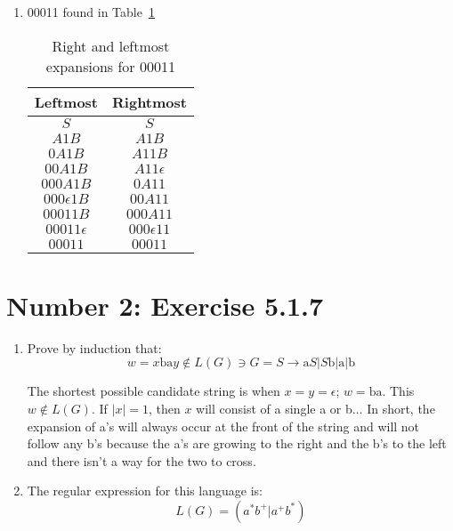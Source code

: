 \documentclass[12pt,a4paper,twoside]{article}  %
\begin{document}
\begin{enumerate}
\item 00011 found in Table~\ref{5.1.2.c}

\begin{table}
\begin{tabular}{c || c }
Leftmost & Rightmost \\
\hline\hline
$S$             & $S$ \\
$A1B$           & $A1B$ \\
$0A1B$          & $A11B$ \\
$00A1B$         & $A11\epsilon$ \\
$000A1B$        & $0A11$ \\
$000\epsilon1B$ & $00A11$ \\
$00011B$        & $000A11$ \\
$00011\epsilon$ & $000\epsilon11$ \\
$00011$         & $00011$
\end{tabular}
\caption{Right and leftmost expansions for 00011}\label{5.1.2.c}
\end{table}

\end{enumerate}

\section{Number 2: Exercise 5.1.7}

\begin{enumerate}

\item Prove by induction that:
\begin{equation}
w = x\textrm{ba}y \not \in L(G) \ni G = S \rightarrow \textrm{a}S |
S\textrm{b} | \textrm{a} | \textrm{b}
\end{equation}

The shortest possible candidate string is when $x = y = \epsilon$; $w
= \textrm{ba}$. This $w \not \in L(G)$. If $|x| = 1$, then $x$ will
consist of a single a or b$\ldots$ In short, the expansion of a's will
always occur at the front of the string and will not follow any b's
because the a's are growing to the right and the b's to the left and
there isn't a way for the two to cross.

\item The regular expression for this language is:
\begin{equation}
L(G) = (a^*b^+|a^+b^*)
\end{equation}

\end{enumerate}
\end{document}
